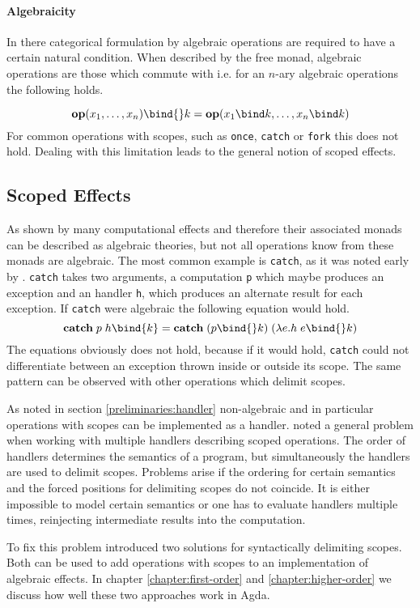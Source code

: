 \paragraph{Algebraicity}
In there categorical formulation by \textcite{DBLP:conf/fossacs/PlotkinP02}
algebraic operations are required to have a certain natural condition.
When described by the free monad, algebraic operations are those which commute
with \AgdaFunction{>>=} i.e. for an $n$-ary algebraic operations the following
holds.

\[
  \mathbf{op}(x_1,\dots ,x_n) \bind{} k = \mathbf{op}(x_1\bind k,\dots
  ,x_n\bind k)
\]
For common operations with scopes, such as \texttt{once}, \texttt{catch} or
\texttt{fork} this does not hold.
Dealing with this limitation leads to the general notion of scoped effects.


\subsection{Scoped Effects}
\label{preliminaries:scoped-effects}

As shown by \textcite{DBLP:conf/fossacs/PlotkinP02} many computational effects
and therefore their associated monads can be described as algebraic theories,
but not all operations know from these monads are algebraic.
The most common example is \texttt{catch}, as it was noted early by
\textcite{DBLP:journals/acs/PlotkinP03}.
\texttt{catch} takes two arguments, a computation \texttt{p} which maybe
produces an exception and an handler \texttt{h}, which produces an alternate
result for each exception.
If \texttt{catch} were algebraic the following equation would hold.
\[
  \textbf{catch}\; p\; h \bind{k} = \textbf{catch}\;(p\bind{} k)\;(\lambda
  e.h\; e \bind{} k)
\]
The equations obviously does not hold, because if it would hold, \texttt{catch}
could not differentiate between an exception thrown inside or outside its scope.
The same pattern can be observed with other operations which delimit scopes.

As noted in section \ref{preliminaries:handler} non-algebraic and in particular
operations with scopes can be implemented as a handler.
\textcite{DBLP:conf/haskell/WuSH14} noted a general problem when working with
multiple handlers describing scoped operations.
The order of handlers determines the semantics of a program, but simultaneously
the handlers are used to delimit scopes.
Problems arise if the ordering for certain semantics and the forced positions
for delimiting scopes do not coincide.
It is either impossible to model certain semantics or one has to evaluate
handlers multiple times, reinjecting intermediate results into the
computation. %

To fix this problem \textcite{DBLP:conf/haskell/WuSH14} introduced two solutions
for syntactically delimiting scopes.
Both can be used to add operations with scopes to an implementation of algebraic
effects.
In chapter \ref{chapter:first-order} and \ref{chapter:higher-order} we discuss
how well these two approaches work in Agda.


